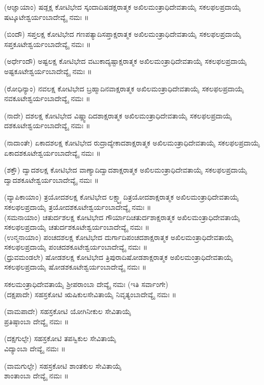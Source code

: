 (ಆಜ್ಞಾಯಾಂ) ಷಡ್ಲಕ್ಷ ಕೋಟಿಭೇದ ಸ್ಕಂದಾದಿಷಡಕ್ಷರಾತ್ಮಕ ಅಖಿಲಮಂತ್ರಾಧಿದೇವತಾಯೈ ಸಕಲಫಲಪ್ರದಾಯೈ ಷಟ್ಕೂಟೇಶ್ವರ್ಯಂಬಾದೇವ್ಯೈ ನಮಃ ॥

(ಬಿಂದೌ) ಸಪ್ತಲಕ್ಷ ಕೋಟಿಭೇದ ಗಣಪತ್ಯಾದಿಸಪ್ತಾಕ್ಷರಾತ್ಮಕ ಅಖಿಲಮಂತ್ರಾಧಿದೇವತಾಯೈ ಸಕಲಫಲಪ್ರದಾಯೈ ಸಪ್ತಕೂಟೇಶ್ವರ್ಯಂಬಾದೇವ್ಯೈ ನಮಃ ॥

(ಅರ್ಧೇಂದೌ) ಅಷ್ಟಲಕ್ಷ ಕೋಟಿಭೇದ ವಟುಕಾದ್ಯಷ್ಟಾಕ್ಷರಾತ್ಮಕ ಅಖಿಲಮಂತ್ರಾಧಿದೇವತಾಯೈ ಸಕಲಫಲಪ್ರದಾಯೈ ಅಷ್ಟಕೂಟೇಶ್ವರ್ಯಂಬಾದೇವ್ಯೈ ನಮಃ ॥

(ರೋಧಿನ್ಯಾಂ) ನವಲಕ್ಷ ಕೋಟಿಭೇದ ಬ್ರಹ್ಮಾದಿನವಾಕ್ಷರಾತ್ಮಕ ಅಖಿಲಮಂತ್ರಾಧಿದೇವತಾಯೈ ಸಕಲಫಲಪ್ರದಾಯೈ ನವಕೂಟೇಶ್ವರ್ಯಂಬಾದೇವ್ಯೈ ನಮಃ ॥

(ನಾದೇ) ದಶಲಕ್ಷ ಕೋಟಿಭೇದ ವಿಷ್ಣ್ವಾದಿದಶಾಕ್ಷರಾತ್ಮಕ ಅಖಿಲಮಂತ್ರಾಧಿದೇವತಾಯೈ ಸಕಲಫಲಪ್ರದಾಯೈ ದಶಕೂಟೇಶ್ವರ್ಯಂಬಾದೇವ್ಯೈ ನಮಃ ॥

(ನಾದಾಂತೇ) ಏಕಾದಶಲಕ್ಷ ಕೋಟಿಭೇದ ರುದ್ರಾದ್ಯೇಕಾದಶಾಕ್ಷರಾತ್ಮಕ ಅಖಿಲಮಂತ್ರಾಧಿದೇವತಾಯೈ ಸಕಲಫಲಪ್ರದಾಯೈ ಏಕಾದಶಕೂಟೇಶ್ವರ್ಯಂಬಾದೇವ್ಯೈ ನಮಃ ॥

(ಶಕ್ತೌ) ದ್ವಾದಶಲಕ್ಷ ಕೋಟಿಭೇದ ವಾಣ್ಯಾದಿದ್ವಾದಶಾಕ್ಷರಾತ್ಮಕ ಅಖಿಲಮಂತ್ರಾಧಿದೇವತಾಯೈ ಸಕಲಫಲಪ್ರದಾಯೈ ದ್ವಾದಶಕೂಟೇಶ್ವರ್ಯಂಬಾದೇವ್ಯೈ ನಮಃ ॥

(ವ್ಯಾಪಿಕಾಯಾಂ) ತ್ರಯೋದಶಲಕ್ಷ ಕೋಟಿಭೇದ ಲಕ್ಷ್ಮ್ಯಾದಿತ್ರಯೋದಶಾಕ್ಷರಾತ್ಮಕ ಅಖಿಲಮಂತ್ರಾಧಿದೇವತಾಯೈ ಸಕಲಫಲಪ್ರದಾಯೈ ತ್ರಯೋದಶಕೂಟೇಶ್ವರ್ಯಂಬಾದೇವ್ಯೈ ನಮಃ ॥\\
(ಸಮನಾಯಾಂ) ಚತುರ್ದಶಲಕ್ಷ ಕೋಟಿಭೇದ ಗೌರ್ಯಾದಿಚತುರ್ದಶಾಕ್ಷರಾತ್ಮಕ ಅಖಿಲಮಂತ್ರಾಧಿದೇವತಾಯೈ ಸಕಲಫಲಪ್ರದಾಯೈ ಚತುರ್ದಶಕೂಟೇಶ್ವರ್ಯಂಬಾದೇವ್ಯೈ ನಮಃ ॥\\
(ಉನ್ಮನಾಯಾಂ) ಪಂಚದಶಲಕ್ಷ ಕೋಟಿಭೇದ ದುರ್ಗಾದಿಪಂಚದಶಾಕ್ಷರಾತ್ಮಕ ಅಖಿಲಮಂತ್ರಾಧಿದೇವತಾಯೈ ಸಕಲಫಲಪ್ರದಾಯೈ ಪಂಚದಶಕೂಟೇಶ್ವರ್ಯಂಬಾದೇವ್ಯೈ ನಮಃ ॥\\
(ಧ್ರುವಮಂಡಲೇ) ಷೋಡಶಲಕ್ಷ ಕೋಟಿಭೇದ ತ್ರಿಪುರಾದಿಷೋಡಶಾಕ್ಷರಾತ್ಮಕ ಅಖಿಲಮಂತ್ರಾಧಿದೇವತಾಯೈ ಸಕಲಫಲಪ್ರದಾಯೈ ಷೋಡಶಕೂಟೇಶ್ವರ್ಯಂಬಾದೇವ್ಯೈ ನಮಃ ॥

  ಸಕಲಮಂತ್ರಾಧಿದೇವತಾಯೈ  ಶ್ರೀಪರಾಂಬಾ ದೇವ್ಯೈ ನಮಃ  (ಇತಿ ಸರ್ವಾಂಗೇ)
 \newpage
{} \\
(ದಕ್ಷಪಾದೇ) ಸಹಸ್ರಕೋಟಿ ಋಷಿಕುಲಸೇವಿತಾಯೈ ನಿವೃತ್ಯಂಬಾದೇವ್ಯೈ ನಮಃ ॥

(ವಾಮಪಾದೇ) ಸಹಸ್ರಕೋಟಿ ಯೋಗಿನೀಕುಲ ಸೇವಿತಾಯೈ\\ ಪ್ರತಿಷ್ಠಾಂಬಾ ದೇವ್ಯೈ ನಮಃ ॥

(ದಕ್ಷಗುಲ್ಫೇ) ಸಹಸ್ರಕೋಟಿ ತಪಸ್ವಿಕುಲ ಸೇವಿತಾಯೈ\\ ವಿದ್ಯಾಂಬಾ ದೇವ್ಯೈ ನಮಃ ॥

(ವಾಮಗುಲ್ಫೇ) ಸಹಸ್ರಕೋಟಿ ಶಾಂತಕುಲ ಸೇವಿತಾಯೈ\\ ಶಾಂತಾಂಬಾ ದೇವ್ಯೈ ನಮಃ ॥

